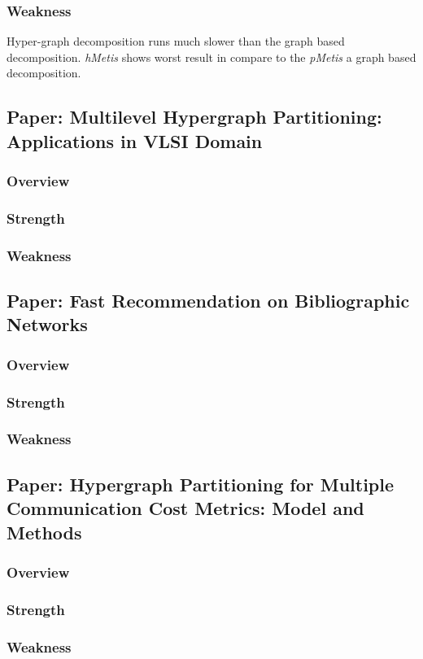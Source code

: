 \documentclass[conference, onecolumn]{IEEEtran}
\begin{document}
\subsubsection{Weakness}
Hyper-graph decomposition runs much slower than the graph based decomposition. \textit{hMetis} shows worst result in compare to the \textit{pMetis} a 
graph based decomposition.

\newpage

\subsection{Paper: Multilevel Hypergraph Partitioning: Applications in VLSI Domain}

\subsubsection{Overview}

\subsubsection{Strength}

\subsubsection{Weakness}


\newpage

\subsection{Paper: Fast Recommendation on Bibliographic Networks}

\subsubsection{Overview}

\subsubsection{Strength}

\subsubsection{Weakness}


\newpage

\subsection{Paper: Hypergraph Partitioning for Multiple Communication Cost Metrics: Model and Methods}

\subsubsection{Overview}

\subsubsection{Strength}

\subsubsection{Weakness}
\end{document}

